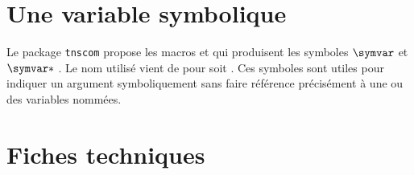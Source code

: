 \documentclass[12pt,a4paper]{article}
\begin{document}
\section{Une variable \og symbolique \fg{}}

Le package \verb+tnscom+ propose les macros  et  qui produisent les symboles $\symvar$ et $\symvar*$ . Le nom utilisé vient de  pour   soit .
Ces symboles sont utiles pour indiquer un argument symboliquement sans faire référence précisément à une ou des variables nommées.




\section{Fiches techniques}


\end{document}

